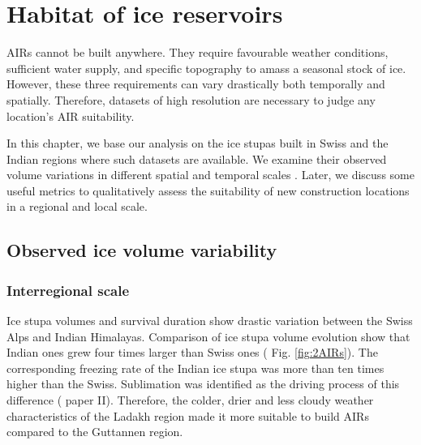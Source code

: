 \chapter{Habitat of ice reservoirs}


AIRs cannot be built anywhere. They require favourable weather conditions, sufficient water supply, and specific
topography to amass a seasonal stock of ice. However, these three requirements can vary drastically both
temporally and spatially. Therefore, datasets of high resolution are necessary to judge any location's AIR
suitability. 

In this chapter, we base our analysis on the ice stupas built in Swiss and the Indian regions where such
datasets are available. We examine their observed volume variations in different spatial and temporal scales .
Later, we discuss some useful metrics to qualitatively assess the suitability of new construction locations in a
regional and local scale.

\section{Observed ice volume variability}

\subsection{Interregional scale}


Ice stupa volumes and survival duration show drastic variation between the Swiss Alps and Indian Himalayas.
Comparison of ice stupa volume evolution show that Indian ones grew four times larger than Swiss ones (  Fig.
\ref{fig:2AIRs}). The corresponding freezing rate of the Indian ice stupa was more than ten times higher than the
Swiss. Sublimation was identified as the driving process of this difference (  paper II). Therefore, the
colder, drier and less cloudy weather characteristics of the Ladakh region made it more suitable to build AIRs
compared to the Guttannen region. 

